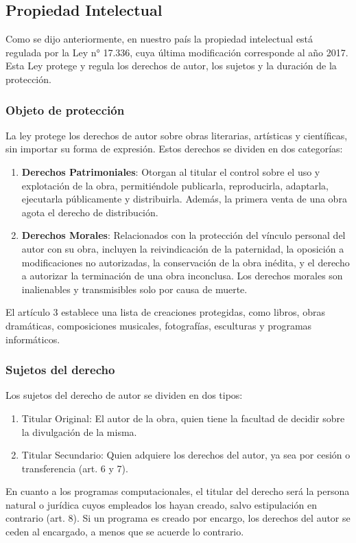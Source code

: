 \documentclass{templateNote}
\begin{document}
\subsection{Propiedad Intelectual}
Como se dijo anteriormente, en nuestro país la propiedad intelectual está regulada por la Ley n° 17.336, cuya última modificación corresponde al año 2017. Esta Ley protege y regula los derechos de autor, los sujetos y la duración de la protección. 

\subsubsection{Objeto de protección}
La ley protege los derechos de autor sobre obras literarias, artísticas y científicas, sin importar su forma de expresión. Estos derechos se dividen en dos categorías:

\begin{enumerate}[label=\alph*)]
    \item \textbf{Derechos Patrimoniales}: Otorgan al titular el control sobre el uso y explotación de la obra, permitiéndole publicarla, reproducirla, adaptarla, ejecutarla públicamente y distribuirla. Además, la primera venta de una obra agota el derecho de distribución.
    \item \textbf{Derechos Morales}: Relacionados con la protección del vínculo personal del autor con su obra, incluyen la reivindicación de la paternidad, la oposición a modificaciones no autorizadas, la conservación de la obra inédita, y el derecho a autorizar la terminación de una obra inconclusa. Los derechos morales son inalienables y transmisibles solo por causa de muerte.
\end{enumerate}

El artículo 3 establece una lista de creaciones protegidas, como libros, obras dramáticas, composiciones musicales, fotografías, esculturas y programas informáticos.

\subsubsection{Sujetos del derecho}
Los sujetos del derecho de autor se dividen en dos tipos:
\begin{enumerate}
    \item Titular Original: El autor de la obra, quien tiene la facultad de decidir sobre la divulgación de la misma.
    \item Titular Secundario: Quien adquiere los derechos del autor, ya sea por cesión o transferencia (art. 6 y 7).
\end{enumerate}
En cuanto a los programas computacionales, el titular del derecho será la persona natural o jurídica cuyos empleados los hayan creado, salvo estipulación en contrario (art. 8). Si un programa es creado por encargo, los derechos del autor se ceden al encargado, a menos que se acuerde lo contrario.
\end{document}
